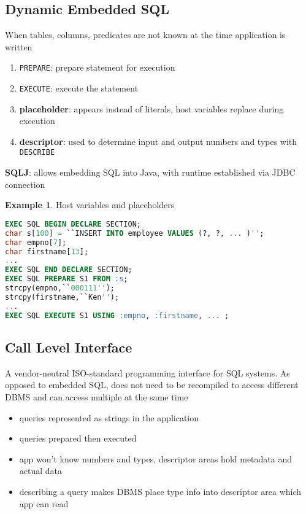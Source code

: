 \documentclass[]{article}
\theoremstyle{definition}
\newtheorem{ex}{Example}[section]
\begin{document}
		\subsection{Dynamic Embedded SQL}
			When tables, columns, predicates are not known at the time application is written
			\begin{enumerate}
				\item \lstinline|PREPARE|: prepare statement for execution
				\item \lstinline|EXECUTE|: execute the statement
				\item \textbf{placeholder}: appears instead of literals, host variables replace during execution
				\item \textbf{descriptor}: used to determine input and output numbers and types with \tt{DESCRIBE}
			\end{enumerate}
			\textbf{SQLJ}: allows embedding SQL into Java, with runtime established via JDBC connection
			\begin{ex}
				Host variables and placeholders
				\begin{lstlisting}[language=SQL]
EXEC SQL BEGIN DECLARE SECTION;
char s[100] = ``INSERT INTO employee VALUES (?, ?, ... )'';
char empno[7];
char firstname[13];
...
EXEC SQL END DECLARE SECTION;
EXEC SQL PREPARE S1 FROM :s;
strcpy(empno,``000111'');
strcpy(firstname,``Ken'');
...
EXEC SQL EXECUTE S1 USING :empno, :firstname, ... ;
				\end{lstlisting}
			\end{ex}
		\subsection{Call Level Interface}
			A vendor-neutral ISO-standard programming interface for SQL systems. As opposed to embedded SQL, does not need to be recompiled to access different DBMS and can access multiple at the same time
			\begin{itemize}
				\item queries represented as strings in the application
				\item queries prepared then executed
				\item app won't know numbers and types, descriptor areas hold metadata and actual data
				\item describing a query makes DBMS place type info into descriptor area which app can read
			\end{itemize}
\end{document}
